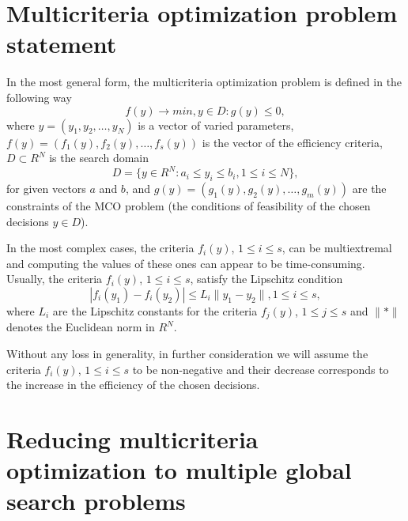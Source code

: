 \documentclass[runningheads]{llncs}
\begin{document}
\section{Multicriteria optimization problem statement} \label{sec:2}

In the most general form, the multicriteria optimization problem is defined in the following way 
\begin{equation}
f(y) \to min, y \in D :g(y) \leq 0 ,
\label{eq:1}
\end{equation}
where $y=(y_1,y_2, \dots ,y_N)$ is a vector of varied parameters, \\$f(y)=(f_1 (y),f_2 (y), \dots ,f_s (y))$ is the vector of the efficiency criteria, $D \subset R^N$ is the search domain 
\begin{equation}
D = \{ y\in R^N:a_i \leq y_i \leq b_i, 1 \leq i \leq N \},
\label{eq:2}
\end{equation}
for given vectors $a$ and $b$, and $g(y)= (g_1 (y),g_2 (y), \dots ,g_m (y))$ are the constraints of the MCO problem (the conditions of feasibility of the chosen decisions $y \in D$).

In the most complex cases, the criteria $f_i (y)$, $1 \leq i \leq s$, can be multiextremal and computing the values of these ones can appear to be time-consuming. Usually, the criteria $f_i (y)$, $1 \leq i \leq s$, satisfy the Lipschitz condition 
\begin{equation}
|f_i (y_1 )-f_i (y_2 ) | \leq L_i \|y_1-y_2\|,1 \leq i \leq s,
\label{eq:3}
\end{equation}
where $L_i$ are the Lipschitz constants for the criteria $f_j (y)$, $1 \leq j \leq s$ and $\|*\|$ denotes the Euclidean norm in $R^N$. 

Without any loss in generality, in further consideration we will assume the criteria $f_i (y)$, $1 \leq i \leq s$ to be non-negative and their decrease corresponds to the increase in the efficiency of the chosen decisions. 


\section{Reducing multicriteria optimization to multiple
global search problems} \label{sec:3}
\end{document}
